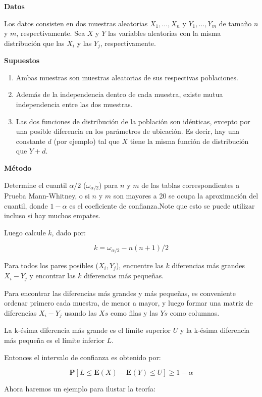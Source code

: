\documentclass[a4paper,oneside,openany]{book}
\begin{document}
\textbf{Datos}

Los datos consisten en dos muestras aleatorias \(X_{1}, \ldots, X_{n}\)
y \(Y_{1}, \ldots, Y_{m}\) de tamaño \(n\) y \(m\), respectivamente. Sea
\(X\) y \(Y\) las variables aleatorias con la misma distribución que las
\(X_{i}\) y las \(Y_{j}\), respectivamente.

\textbf{Supuestos}

\begin{enumerate}
\def\labelenumi{\arabic{enumi})}
\item
  Ambas muestras son muestras aleatorias de sus respectivas poblaciones.
\item
  Además de la independencia dentro de cada muestra, existe mutua
  independencia entre las dos muestras.
\item
  Las dos funciones de distribución de la población son idénticas,
  excepto por una posible diferencia en los parámetros de ubicación. Es
  decir, hay una constante \(d\) (por ejemplo) tal que \(X\) tiene la
  misma función de distribución que \(Y + d\).
\end{enumerate}

\textbf{Método}

Determine el cuantil \(\alpha/2\) (\(\omega_{\alpha/2}\)) para \(n\) y
\(m\) de las tablas correspondientes a Prueba Mann-Whitney, o si \(n\) y
\(m\) son mayores a 20 se ocupa la aproximación del cuantil, donde
\(1-\alpha\) es el coeficiente de confianza.Note que esto se puede
utilizar incluso si hay muchos empates.

Luego calcule \(k\), dado por:

\[k= \omega_{\alpha/2}-n(n+1)/2\]

Para todos los pares posibles (\(X_{i},Y_{j}\)), encuentre las \(k\)
diferencias más grandes \(X_{i}-Y_{j}\) y encontrar las \(k\)
diferencias más pequeñas.

Para encontrar las diferencias más grandes y más pequeñas, es
conveniente ordenar primero cada muestra, de menor a mayor, y luego
formar una matriz de diferencias \(X_{i}-Y_{j}\) usando las \(Xs\) como
filas y las \(Ys\) como columnas.

La k-ésima diferencia más grande es el límite superior \(U\) y la
k-ésima diferencia más pequeña es el límite inferior \(L\).

Entonces el intervalo de confianza es obtenido por:

\[\mathbf{P}[L\leq \mathbf{E}(X)-\mathbf{E}(Y)\leq U]\geq 1-\alpha\]

Ahora haremos un ejemplo para ilustar la teoría:
\end{document}
